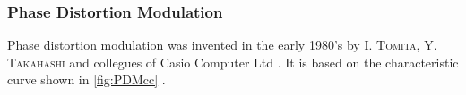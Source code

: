 \documentclass[a4paper]{article}
\newcommand\person[1]{\textsc{#1}}
\begin{document}
\subsubsection{Phase Distortion Modulation}
\newcommand\PDMcharact[3]{{%
  \begin{scope}[shift={(#1,#2)}]
    \def\aI{#3}
    \def\xxI{1/(2*\aI)}
    \draw[thick,domain=0:\xxI,variable=\x] plot ({\x},{\a*\x});
    \draw[thick,domain=\xxI:1,variable=\x] plot ({\x},{(\a*\x+\a-1)/(2*\a-1)});
  \end{scope}
}}
\newcommand\PDMsine[3]{{%
  \begin{scope}[shift={(#1,#2)}]
    \def\aI{#3}
    \def\xxI{1/(2*\aI)}
    \draw[very thin,dashed,domain=0:1,variable=\x] plot ({\x},{0.5*sin(360*\x-90)});
    \draw[thick,domain=0:\xxI,variable=\x] plot ({\x},{0.5*sin(360*\a*\x-90)});
    \draw[thick,domain=\xxI:1,variable=\x] plot ({\x},{0.5*sin(360*((\a*\x+\a-1)/(2*\a-1))-90)});
  \end{scope}
}}
Phase distortion modulation was invented in the early 1980's by \person{I.
Tomita}, \person{Y. Takahashi} and collegues of Casio Computer Ltd \cite{Ger09}.
It is based on the characteristic curve shown in \cref{fig:PDMcc}
\cite[p.\,20--21]{CZ1manual}.
%
\end{document}
